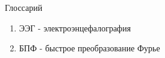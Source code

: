 \begin{frame}{Глоссарий}
    \begin{enumerate}
        \item ЭЭГ - электроэнцефалография
        \item БПФ - быстрое преобразование Фурье
    \end{enumerate}
\end{frame}
